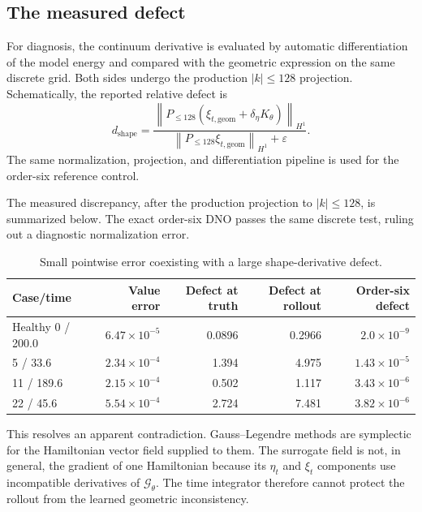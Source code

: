 \documentclass[11pt]{article}
\newcommand{\Gt}{\mathcal{G}_{\theta}}
\newcommand{\norm}[1]{\left\lVert #1\right\rVert}
\begin{document}
\subsection{The measured defect}

For diagnosis, the continuum derivative is evaluated by automatic
differentiation of the model energy and compared with the geometric expression
on the same discrete grid.  Both sides undergo the production
\(|k|\leq128\) projection.  Schematically, the reported relative defect is
\begin{equation}
 d_{\mathrm{shape}}
 =\frac{\norm{P_{\leq128}(
      \xi_{t,\mathrm{geom}}+\delta_\eta K_\theta
   )}_{H^1}}
 {\norm{P_{\leq128}\xi_{t,\mathrm{geom}}}_{H^1}+\varepsilon}.
 \label{eq:shape-defect}
\end{equation}
The same normalization, projection, and differentiation pipeline is used for
the order-six reference control.

The measured discrepancy, after the production projection to \(|k|\leq128\),
is summarized below.  The exact order-six DNO passes the same discrete test,
ruling out a diagnostic normalization error.

\begin{table}[ht]
\centering
\small
\begin{tabular}{lrrrr}
\toprule
Case/time & Value error & Defect at truth & Defect at rollout & Order-six defect \\
\midrule
Healthy 0 / 200.0 & $6.47\times10^{-5}$ & 0.0896 & 0.2966 & $2.0\times10^{-9}$ \\
5 / 33.6          & $2.34\times10^{-4}$ & 1.394  & 4.975  & $1.43\times10^{-5}$ \\
11 / 189.6        & $2.15\times10^{-4}$ & 0.502  & 1.117  & $3.43\times10^{-6}$ \\
22 / 45.6         & $5.54\times10^{-4}$ & 2.724  & 7.481  & $3.82\times10^{-6}$ \\
\bottomrule
\end{tabular}
\caption{Small pointwise error coexisting with a large shape-derivative defect.}
\label{tab:shape}
\end{table}

This resolves an apparent contradiction.  Gauss--Legendre methods are
symplectic for the Hamiltonian vector field supplied to them.  The surrogate
field is not, in general, the gradient of one Hamiltonian because its
\(\eta_t\) and \(\xi_t\) components use incompatible derivatives of \(\Gt\).
The time integrator therefore cannot protect the rollout from the learned
geometric inconsistency.
\end{document}
